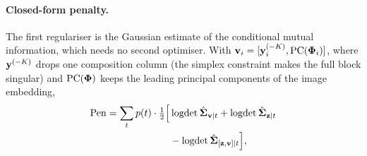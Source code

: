 \paragraph{Closed-form penalty.}
 The first regulariser is the Gaussian estimate of the conditional mutual information, which needs no second optimiser. With $\mathbf{v}_i = [\mathbf{y}_i^{(-K)}, \mathrm{PC}(\boldsymbol{\Phi}_i)]$, where $\mathbf{y}^{(-K)}$ drops one composition column (the simplex constraint makes the full block singular) and $\mathrm{PC}(\boldsymbol{\Phi})$ keeps the leading principal components of the image embedding,
\begin{equation}
\begin{split}
  \mathrm{Pen} = \sum_t p(t)\cdot \tfrac{1}{2}\Big[&\operatorname{logdet} \hat{\boldsymbol{\Sigma}}_{\mathbf{v} \mid t} + \operatorname{logdet} \hat{\boldsymbol{\Sigma}}_{\mathbf{z} \mid t} \\
  &- \operatorname{logdet} \hat{\boldsymbol{\Sigma}}_{[\mathbf{z},\mathbf{v}] \mid t}\Big],
\end{split}
\label{eq:penalty}
\end{equation}
